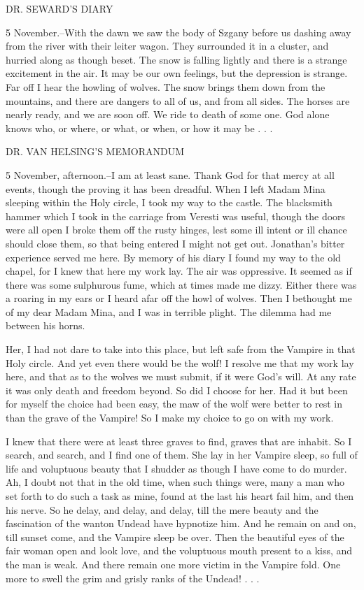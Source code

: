 DR. SEWARD'S DIARY 

5 November.--With the dawn we saw the body of Szgany before us dashing away from the river with their leiter wagon. They surrounded it in a cluster, and hurried along as though beset. The snow is falling lightly and there is a strange excitement in the air. It may be our own feelings, but the depression is strange. Far off I hear the howling of wolves. The snow brings them down from the mountains, and there are dangers to all of us, and from all sides. The horses are nearly ready, and we are soon off. We ride to death of some one. God alone knows who, or where, or what, or when, or how it may be . . . 

DR. VAN HELSING'S MEMORANDUM 

5 November, afternoon.--I am at least sane. Thank God for that mercy at all events, though the proving it has been dreadful. When I left Madam Mina sleeping within the Holy circle, I took my way to the castle. The blacksmith hammer which I took in the carriage from Veresti was useful, though the doors were all open I broke them off the rusty hinges, lest some ill intent or ill chance should close them, so that being entered I might not get out. Jonathan's bitter experience served me here. By memory of his diary I found my way to the old chapel, for I knew that here my work lay. The air was oppressive. It seemed as if there was some sulphurous fume, which at times made me dizzy. Either there was a roaring in my ears or I heard afar off the howl of wolves. Then I bethought me of my dear Madam Mina, and I was in terrible plight. The dilemma had me between his horns. 

Her, I had not dare to take into this place, but left safe from the Vampire in that Holy circle. And yet even there would be the wolf! I resolve me that my work lay here, and that as to the wolves we must submit, if it were God's will. At any rate it was only death and freedom beyond. So did I choose for her. Had it but been for myself the choice had been easy, the maw of the wolf were better to rest in than the grave of the Vampire! So I make my choice to go on with my work. 

I knew that there were at least three graves to find, graves that are inhabit. So I search, and search, and I find one of them. She lay in her Vampire sleep, so full of life and voluptuous beauty that I shudder as though I have come to do murder. Ah, I doubt not that in the old time, when such things were, many a man who set forth to do such a task as mine, found at the last his heart fail him, and then his nerve. So he delay, and delay, and delay, till the mere beauty and the fascination of the wanton Undead have hypnotize him. And he remain on and on, till sunset come, and the Vampire sleep be over. Then the beautiful eyes of the fair woman open and look love, and the voluptuous mouth present to a kiss, and the man is weak. And there remain one more victim in the Vampire fold. One more to swell the grim and grisly ranks of the Undead! . . . 

